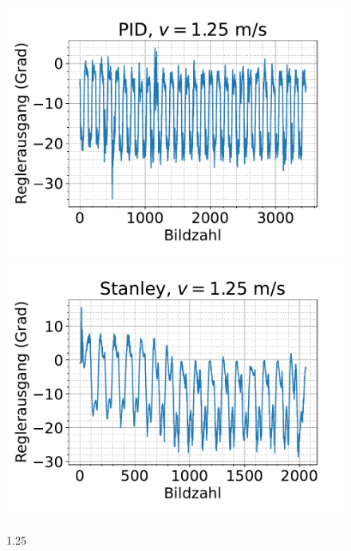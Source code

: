 \documentclass[arbeit=studie,oneside,BCOR=12mm]{ArbeitRST}
\begin{document}
\begin{figure}[h]
    \centering
    \includegraphics[scale=0.47]{pid1.25}
    \includegraphics[scale=0.47]{Stan1.25}
    \caption{1.25}
    \label{ausrei}
\end{figure}
\end{document}
